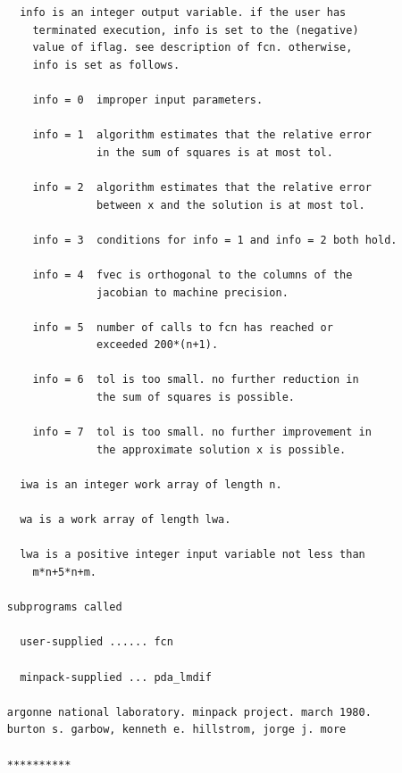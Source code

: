 \documentclass[11pt,twoside]{article}
\begin{document}
\begin{verbatim}
       info is an integer output variable. if the user has
         terminated execution, info is set to the (negative)
         value of iflag. see description of fcn. otherwise,
         info is set as follows.

         info = 0  improper input parameters.

         info = 1  algorithm estimates that the relative error
                   in the sum of squares is at most tol.

         info = 2  algorithm estimates that the relative error
                   between x and the solution is at most tol.

         info = 3  conditions for info = 1 and info = 2 both hold.

         info = 4  fvec is orthogonal to the columns of the
                   jacobian to machine precision.

         info = 5  number of calls to fcn has reached or
                   exceeded 200*(n+1).

         info = 6  tol is too small. no further reduction in
                   the sum of squares is possible.

         info = 7  tol is too small. no further improvement in
                   the approximate solution x is possible.

       iwa is an integer work array of length n.

       wa is a work array of length lwa.

       lwa is a positive integer input variable not less than
         m*n+5*n+m.

     subprograms called

       user-supplied ...... fcn

       minpack-supplied ... pda_lmdif

     argonne national laboratory. minpack project. march 1980.
     burton s. garbow, kenneth e. hillstrom, jorge j. more

     **********
\end{verbatim}
\end{document}
